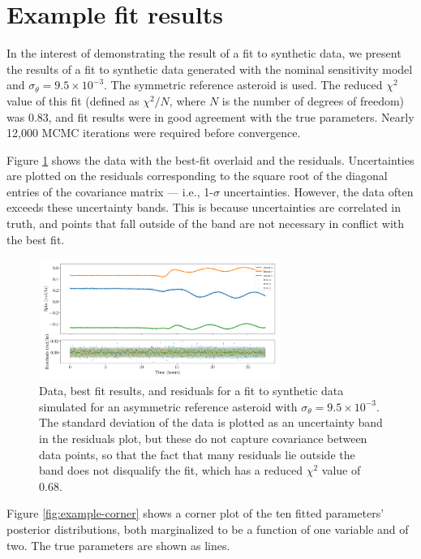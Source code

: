 \documentclass{aastex631}
\begin{document}
\section{Example fit results}
In the interest of demonstrating the result of a fit to synthetic data, we present the results of a fit to synthetic data generated with the nominal sensitivity model and $\sigma_\theta = 9.5 \times 10^{-3}$. The symmetric reference asteroid is used. The reduced $\chi^2$ value of this fit (defined as $\chi^2 / N$, where $N$ is the number of degrees of freedom) was 0.83, and fit results were in good agreement with the true parameters. Nearly 12,000 MCMC iterations were required before convergence.

Figure \ref{fig:example-residuals} shows the data with the best-fit overlaid and the residuals. Uncertainties are plotted on the residuals corresponding to the square root of the diagonal entries of the covariance matrix --- i.e., 1-$\sigma$ uncertainties. However, the data often exceeds these uncertainty bands. This is because uncertainties are correlated in truth, and points that fall outside of the band are not necessary in conflict with the best fit.

\begin{figure}
  \centering
  \includegraphics[width=0.7\textwidth]{example-residuals.pdf}
  \caption{Data, best fit results, and residuals for a fit to synthetic data simulated for an asymmetric reference asteroid with $\sigma_\theta = 9.5 \times 10^{-3}$. The standard deviation of the data is plotted as an uncertainty band in the residuals plot, but these do not capture covariance between data points, so that the fact that many residuals lie outside the band does not disqualify the fit, which has a reduced $\chi^2$ value of 0.68.}
  \label{fig:example-residuals}
\end{figure}

Figure \ref{fig:example-corner} shows a corner plot of the ten fitted parameters' posterior distributions, both marginalized to be a function of one variable and of two. The true parameters are shown as lines.
\end{document}
